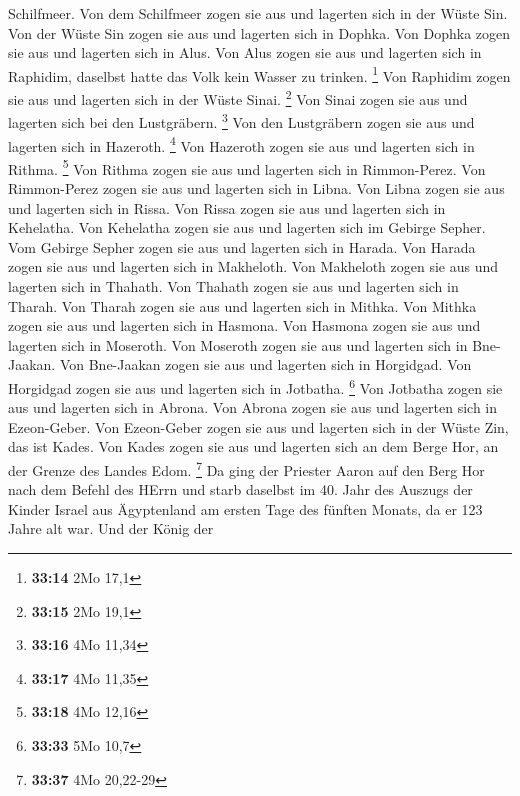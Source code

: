 Schilfmeer.  Von dem Schilfmeer zogen sie aus und lagerten
sich in der Wüste Sin.  Von der Wüste Sin zogen sie aus und
lagerten sich in Dophka.  Von Dophka zogen sie aus und
lagerten sich in Alus.  Von Alus zogen sie aus und lagerten
sich in Raphidim, daselbst hatte das Volk kein Wasser zu trinken.
\footnote{\textbf{33:14} 2Mo 17,1}  Von Raphidim zogen sie
aus und lagerten sich in der Wüste Sinai. \footnote{\textbf{33:15} 2Mo
  19,1}  Von Sinai zogen sie aus und lagerten sich bei den
Lustgräbern. \footnote{\textbf{33:16} 4Mo 11,34}  Von den
Lustgräbern zogen sie aus und lagerten sich in Hazeroth. \footnote{\textbf{33:17}
  4Mo 11,35}  Von Hazeroth zogen sie aus und lagerten sich
in Rithma. \footnote{\textbf{33:18} 4Mo 12,16}  Von Rithma
zogen sie aus und lagerten sich in Rimmon-Perez.  Von
Rimmon-Perez zogen sie aus und lagerten sich in Libna.  Von
Libna zogen sie aus und lagerten sich in Rissa.  Von Rissa
zogen sie aus und lagerten sich in Kehelatha.  Von
Kehelatha zogen sie aus und lagerten sich im Gebirge Sepher.
 Vom Gebirge Sepher zogen sie aus und lagerten sich in
Harada.  Von Harada zogen sie aus und lagerten sich in
Makheloth.  Von Makheloth zogen sie aus und lagerten sich
in Thahath.  Von Thahath zogen sie aus und lagerten sich in
Tharah.  Von Tharah zogen sie aus und lagerten sich in
Mithka.  Von Mithka zogen sie aus und lagerten sich in
Hasmona.  Von Hasmona zogen sie aus und lagerten sich in
Moseroth.  Von Moseroth zogen sie aus und lagerten sich in
Bne-Jaakan.  Von Bne-Jaakan zogen sie aus und lagerten sich
in Horgidgad.  Von Horgidgad zogen sie aus und lagerten
sich in Jotbatha. \footnote{\textbf{33:33} 5Mo 10,7}  Von
Jotbatha zogen sie aus und lagerten sich in Abrona.  Von
Abrona zogen sie aus und lagerten sich in Ezeon-Geber.  Von
Ezeon-Geber zogen sie aus und lagerten sich in der Wüste Zin, das ist
Kades.  Von Kades zogen sie aus und lagerten sich an dem
Berge Hor, an der Grenze des Landes Edom. \footnote{\textbf{33:37} 4Mo
  20,22-29}  Da ging der Priester Aaron auf den Berg Hor
nach dem Befehl des HErrn und starb daselbst im 40. Jahr des Auszugs der
Kinder Israel aus Ägyptenland am ersten Tage des fünften Monats,
 da er 123 Jahre alt war.  Und der König der
